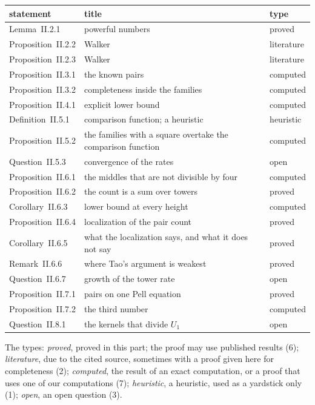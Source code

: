 \begingroup\small
\begin{longtable}{l p{7.2cm} l}
\hline
statement & title & type \\
\hline
\endhead
Lemma~II.2.1 & powerful numbers & proved \\
Proposition~II.2.2 & Walker {\cite[Sections~2 and~3]{Walker1976}} & literature \\
Proposition~II.2.3 & Walker {\cite[Theorems 2.2, 2.5, 3.2 and 3.5]{Walker1976}} & literature \\
Proposition~II.3.1 & the known pairs & computed \\
Proposition~II.3.2 & completeness inside the families & computed \\
Proposition~II.4.1 & explicit lower bound & computed \\
Definition~II.5.1 & comparison function; a heuristic & heuristic \\
Proposition~II.5.2 & the families with a square overtake the comparison function & computed \\
Question~II.5.3 & convergence of the rates & open \\
Proposition~II.6.1 & the middles that are not divisible by four & computed \\
Proposition~II.6.2 & the count is a sum over towers & proved \\
Corollary~II.6.3 & lower bound at every height & computed \\
Proposition~II.6.4 & localization of the pair count & proved \\
Corollary~II.6.5 & what the localization says, and what it does not say & proved \\
Remark~II.6.6 & where Tao's argument is weakest & proved \\
Question~II.6.7 & growth of the tower rate & open \\
Proposition~II.7.1 & pairs on one Pell equation & proved \\
Proposition~II.7.2 & the third number & computed \\
Question~II.8.1 & the kernels that divide $U_1$ & open \\
\hline
\end{longtable}
\endgroup

The types: \emph{proved}, proved in this part; the proof may use published results (6); \emph{literature}, due to the cited source, sometimes with a proof given here for completeness (2); \emph{computed}, the result of an exact computation, or a proof that uses one of our computations (7); \emph{heuristic}, a heuristic, used as a yardstick only (1); \emph{open}, an open question (3).

